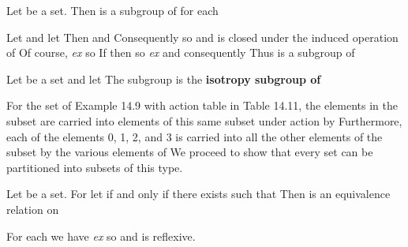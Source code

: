 \documentclass[11pt,oneside]{article}
\begin{document}
\begin{BookBody}

 Let  be a set. Then  is a subgroup of  for each 

 Let  and let  Then  and  Consequently  so  and  is closed under the induced operation of  Of course,\textit{ ex}  so  If  then  so  \textit{ex}   and consequently  Thus  is a subgroup of \BookEnd{\blacklozenge}

 Let  be a set and let  The subgroup  is the\textbf{ isotropy subgroup of} \BookEnd{\blacksquare}


\noindent For the set  of Example 14.9 with action table in Table 14.11, the elements in the subset  are carried into elements of this same subset under action by  Furthermore, each of the elements 0, 1, 2, and 3 is carried into all the other elements of the subset by the various elements of  We proceed to show that every set  can be partitioned into subsets of this type.

 Let  be a set. For  let  if and only if there exists  such that  Then \BookInline{\sim } is an equivalence relation on 

 For each  we have\textit{ ex}  so  and \BookInline{\sim } is reflexive.


\end{BookBody}
\end{document}
